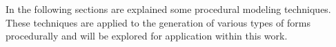 In the following sections are explained some procedural modeling techniques. These techniques are applied to the generation of various types of forms procedurally and will be explored for application within this work.










%



%

%

%








%
%
%
%






